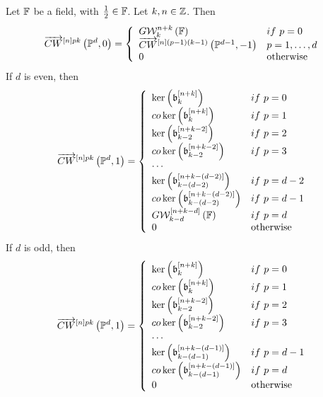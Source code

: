 \documentclass[12pt]{article}
\begin{document}
\bT\label{mainPSpace}{\rm 
Let ${\BF}$ be a field, with $\frac{1}{2}\in {\BF}$. Let $k, n\in {\BZ}$.
%
Then 
$$
\ora{CW}^{\LRt{n}pk}\LRf{{\BP}^d, 0} =
\LBrace{{ll}
G{\CW}^{n+k}_k\LRf{{\BF}} & if ~p=0\\
\ora{CW}^{\LRt{n}(p-1)(k-1)}\LRf{{\BP}^{d-1}, -1} & p=1, \ldots, d\\
0 & {\rm otherwise}\\
} 
$$
If $d$ is even, then 
$$
\ora{CW}^{\LRt{n}pk}\LRf{{\BP}^d, 1} =
%
\LBrace{{ll}
\ker\LRf{\b_k^{\LRt{n+k}}} & if ~p=0\\
co\ker\LRf{\b_k^{\LRt{n+k}}} &  if ~p=1\\
\ker\LRf{\b_{k-2}^{\LRt{n+k-2}}} & if ~p=2\\
co\ker\LRf{\b_{k-2}^{\LRt{n+k-2}}} & if ~ p=3\\
\cdots\\
\ker\LRf{\b_{k-(d-2)}^{\LRt{n+k-(d-2)}}} & if ~p=d-2\\
co\ker\LRf{\b_{k-(d-2)}^{\LRt{n+k-(d-2)}}} & if ~p= d-1\\
G{\CW}_{k-d}^{\LRt{n+k-d}}\LRf{{\BF}}& if ~p= d\\
0 & {\rm otherwise}\\
} 
$$
If $d$ is odd,  then
$$
\ora{CW}^{\LRt{n}pk}\LRf{{\BP}^d, 1} =
%
\LBrace{{ll}
\ker\LRf{\b_k^{\LRt{n+k}}} & if ~p=0\\
co\ker\LRf{\b_k^{\LRt{n+k}}} & if ~ p=1\\
\ker\LRf{\b_{k-2}^{\LRt{n+k-2}}} & if ~p=2\\
co\ker\LRf{\b_{k-2}^{\LRt{n+k-2}}} & if ~ p=3\\
\cdots\\
\ker\LRf{\b_{k-(d-1)}^{\LRt{n+k-(d-1)}}}& if ~p=d-1\\
co\ker\LRf{\b_{k-(d-1)}^{\LRt{n+k-(d-1)}}}& if ~p= d\\
0 & {\rm otherwise}\\
} 
$$

}
\end{document}
